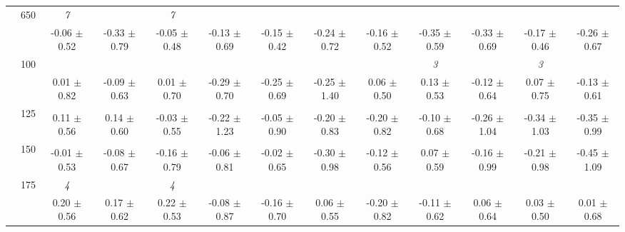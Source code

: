 \begin{table}[h]
{\begin{tabular}{
        ccccccccccccc}
 & \multirow{2}{*}{650}& \textit{ 7 }& & \textit{ 7 }& & & & & & & &  \\ 
 & & -0.06 $\pm$ 0.52& -0.33 $\pm$ 0.79& -0.05 $\pm$ 0.48& -0.13 $\pm$ 0.69& -0.15 $\pm$ 0.42& -0.24 $\pm$ 0.72& -0.16 $\pm$ 0.52& -0.35 $\pm$ 0.59& -0.33 $\pm$ 0.69& -0.17 $\pm$ 0.46& -0.26 $\pm$ 0.67 \\ \midrule 
 & \multirow{2}{*}{100}& & & & & & & & \textit{ 3 }& & \textit{ 3 }&  \\ 
 & & 0.01 $\pm$ 0.82& -0.09 $\pm$ 0.63& 0.01 $\pm$ 0.70& -0.29 $\pm$ 0.70& -0.25 $\pm$ 0.69& -0.25 $\pm$ 1.40& 0.06 $\pm$ 0.50& 0.13 $\pm$ 0.53& -0.12 $\pm$ 0.64& 0.07 $\pm$ 0.75& -0.13 $\pm$ 0.61 \\ 
 & \multirow{2}{*}{125}& \cellcolor[HTML]{EFEFEF} & \cellcolor[HTML]{EFEFEF} & \cellcolor[HTML]{EFEFEF} & \cellcolor[HTML]{EFEFEF} & \cellcolor[HTML]{EFEFEF} & \cellcolor[HTML]{EFEFEF} & \cellcolor[HTML]{EFEFEF} & \cellcolor[HTML]{EFEFEF} & \cellcolor[HTML]{EFEFEF} & \cellcolor[HTML]{EFEFEF} & \cellcolor[HTML]{EFEFEF}  \\ 
 & & \cellcolor[HTML]{EFEFEF} 0.11 $\pm$ 0.56& \cellcolor[HTML]{EFEFEF} 0.14 $\pm$ 0.60& \cellcolor[HTML]{EFEFEF} -0.03 $\pm$ 0.55& \cellcolor[HTML]{EFEFEF} -0.22 $\pm$ 1.23& \cellcolor[HTML]{EFEFEF} -0.05 $\pm$ 0.90& \cellcolor[HTML]{EFEFEF} -0.20 $\pm$ 0.83& \cellcolor[HTML]{EFEFEF} -0.20 $\pm$ 0.82& \cellcolor[HTML]{EFEFEF} -0.10 $\pm$ 0.68& \cellcolor[HTML]{EFEFEF} -0.26 $\pm$ 1.04& \cellcolor[HTML]{EFEFEF} -0.34 $\pm$ 1.03& \cellcolor[HTML]{EFEFEF} -0.35 $\pm$ 0.99 \\ 
 & \multirow{2}{*}{150}& & & & & & & & & & &  \\ 
 & & -0.01 $\pm$ 0.53& -0.08 $\pm$ 0.67& -0.16 $\pm$ 0.79& -0.06 $\pm$ 0.81& -0.02 $\pm$ 0.65& -0.30 $\pm$ 0.98& -0.12 $\pm$ 0.56& 0.07 $\pm$ 0.59& -0.16 $\pm$ 0.99& -0.21 $\pm$ 0.98& -0.45 $\pm$ 1.09 \\ 
 & \multirow{2}{*}{175}& \cellcolor[HTML]{EFEFEF} \textit{ 4 }& \cellcolor[HTML]{EFEFEF} & \cellcolor[HTML]{EFEFEF} \textit{ 4 }& \cellcolor[HTML]{EFEFEF} & \cellcolor[HTML]{EFEFEF} & \cellcolor[HTML]{EFEFEF} & \cellcolor[HTML]{EFEFEF} & \cellcolor[HTML]{EFEFEF} & \cellcolor[HTML]{EFEFEF} & \cellcolor[HTML]{EFEFEF} & \cellcolor[HTML]{EFEFEF}  \\ 
 & & \cellcolor[HTML]{EFEFEF} 0.20 $\pm$ 0.56& \cellcolor[HTML]{EFEFEF} 0.17 $\pm$ 0.62& \cellcolor[HTML]{EFEFEF} 0.22 $\pm$ 0.53& \cellcolor[HTML]{EFEFEF} -0.08 $\pm$ 0.87& \cellcolor[HTML]{EFEFEF} -0.16 $\pm$ 0.70& \cellcolor[HTML]{EFEFEF} 0.06 $\pm$ 0.55& \cellcolor[HTML]{EFEFEF} -0.20 $\pm$ 0.82& \cellcolor[HTML]{EFEFEF} -0.11 $\pm$ 0.62& \cellcolor[HTML]{EFEFEF} 0.06 $\pm$ 0.64& \cellcolor[HTML]{EFEFEF} 0.03 $\pm$ 0.50& \cellcolor[HTML]{EFEFEF} 0.01 $\pm$ 0.68 \\ 

\end{tabular}}
\end{table}
